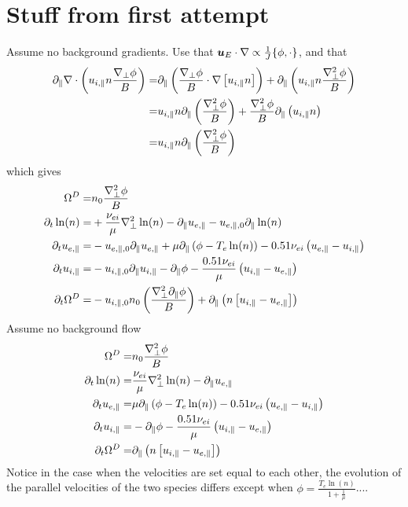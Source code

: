\section{Stuff from first attempt}
%
Assume no background gradients. Use that $\boldsymbol{u}_E\cdot\nabla \propto \frac{1}{J}\{\phi,\cdot\}$, and that
%
\begin{align*}
  \partial_\|\nabla\cdot \left( u_{i,\|}n \frac{\nabla_\perp \phi}{B}\right)
  =&
  \partial_\|\left(\frac{\nabla_\perp \phi}{B}\cdot\nabla \left[ u_{i,\|}n \right]\right)
  +
  \partial_\|\left(u_{i,\|}n  \frac{\nabla_\perp^2 \phi}{B}\right)
  \\
  =&
  u_{i,\|}n \partial_\|\left(\frac{\nabla_\perp^2 \phi}{B}\right)
  +
  \frac{\nabla_\perp^2 \phi}{B} \partial_\|\left(u_{i,\|}n  \right)
  \\
  =&
  u_{i,\|}n \partial_\|\left(\frac{\nabla_\perp^2 \phi}{B}\right)
\end{align*}
%
which gives
%
\begin{align*}
\Om^D =&
n_0\frac{\grad_\perp^2\phi}{B}
\\
%
%
%
\partial_t \ln(n)
=&
 +\frac{\nu_{ei}}{\mu}
   \grad_\perp^2 \ln(n)
- \partial_\|u_{e,\|}
- u_{e,\|,0} \partial_\| \ln(n)
\\
%
%
%
\partial_t u_{e,\|}
 =&
 - u_{e,\|,0} \partial_\| u_{e,\|}
 + \mu \partial_\| \L(\phi - T_e  \ln(n)\R)
 - 0.51 \nu_{ei} \L(u_{e,\|}-u_{i,\|}\R)
\\
%
%
%
\partial_t u_{i,\|}
 =&
 - u_{i,\|,0} \partial_\| u_{i,\|}
 - \partial_\|\phi
 - \frac{ 0.51 \nu_{ei} }{ \mu } \L(u_{i,\|}-u_{e,\|}\R)
\\
%
%
%
  \partial_t \Om^D
  =&
  - u_{i,\|,0}n_0 \L(\frac{\grad_\perp^2 \partial_\| \phi}{B}\R)
 + \partial_\| \L(n\L[ u_{i,\|} - u_{e,\|} \R]\R)
\end{align*}
%
Assume no background flow
%
\begin{align*}
\Om^D =&
n_0\frac{\grad_\perp^2\phi}{B}
\\
%
%
%
\partial_t \ln(n)
=&
 \frac{\nu_{ei}}{\mu}
   \grad_\perp^2 \ln(n)
- \partial_\|u_{e,\|}
\\
%
%
%
\partial_t u_{e,\|}
 =&
 \mu \partial_\| \L(\phi - T_e  \ln(n)\R)
 - 0.51 \nu_{ei} \L(u_{e,\|}-u_{i,\|}\R)
\\
%
%
%
\partial_t u_{i,\|}
 =&
 - \partial_\|\phi
 - \frac{ 0.51 \nu_{ei} }{ \mu } \L(u_{i,\|}-u_{e,\|}\R)
\\
%
%
%
  \partial_t \Om^D
  =&
 \partial_\| \L(n\L[ u_{i,\|} - u_{e,\|} \R]\R)
\end{align*}
%
Notice in the case when the velocities are set equal to each other, the evolution of the parallel velocities of the two species differs except when $\phi = \frac{T_e\ln(n)}{1+\frac{1}{\mu}}$....

